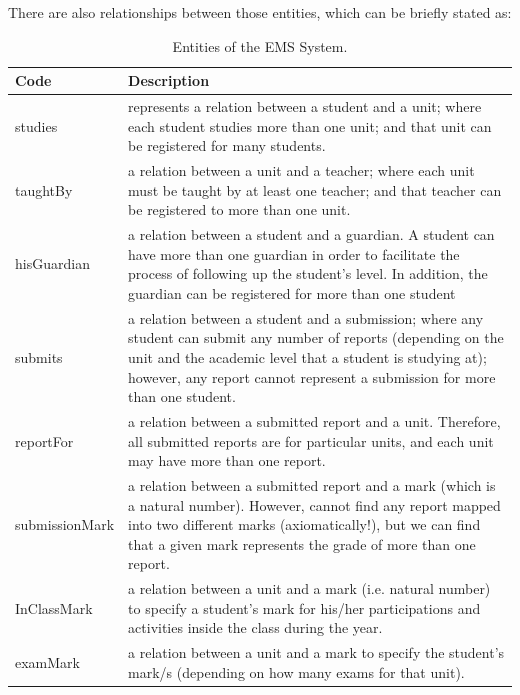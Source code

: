 There are also relationships between those entities, which can be briefly stated as:
\begin{table}[bth]
\centering
\caption{Entities of the EMS System.}
\small
{}
\begin{tabular}{p{0.9 in} p{5.9 in}} \hline 
\hline
Code & Description\\\hline\hline

studies &   represents a relation between a student and a unit; where each student studies more than one unit; and that unit can be registered for many students. \\

taughtBy &  a relation between a unit and a teacher; where each unit must be taught by at least one teacher; and that teacher can be registered to more than one unit.\\

hisGuardian &  a relation between a student and a guardian.  A student can have more than one guardian in order to facilitate the process of following up the student’s level.  In addition, the guardian can be registered for more than one student\\

submits &   a relation between a student and a submission; where any student can submit any number of reports (depending on the unit and the academic level that a student is studying at); however, any report cannot represent a submission for more than one student.\\

reportFor &  a relation between a submitted report and a unit.  Therefore, all submitted reports are for particular units, and each unit may have more than one report. \\

submissionMark &  a relation between a submitted report and a mark (which is a natural number).  However, cannot find any report mapped into two different marks (axiomatically!), but we can find that a given mark represents the grade of more than one report.\\

InClassMark &  a relation between a unit and a mark (i.e. natural number) to specify a student’s mark for his/her participations and activities inside the class during the year. \\

examMark &  a relation between a unit and a mark to specify the student’s mark/s (depending on how many exams for that unit).\\ 


\end{tabular}
\end{table}
